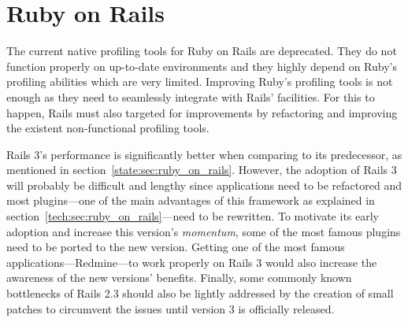 \section{Ruby on Rails}
The current native profiling tools for Ruby on Rails are deprecated. They do not function properly on up-to-date environments and they highly depend on Ruby's profiling abilities which are very limited. Improving Ruby's profiling tools is not enough as they need to seamlessly integrate with Rails' facilities. For this to happen, Rails must also targeted for improvements by refactoring and improving the existent non-functional profiling tools.

Rails 3's performance is significantly better when comparing to its predecessor, as mentioned in section~\ref{state:sec:ruby_on_rails}. However, the adoption of Rails 3 will probably be difficult and lengthy since applications need to be refactored and most plugins---one of the main advantages of this framework as explained in section~\ref{tech:sec:ruby_on_rails}---need to be rewritten. To motivate its early adoption and increase this version's \textit{momentum}, some of the most famous plugins need to be ported to the new version. Getting one of the most famous applications---Redmine---to work properly on Rails 3 would also increase the awareness of the new versions' benefits. Finally, some commonly known bottlenecks of Rails 2.3 should also be lightly addressed by the creation of small patches to circumvent the issues until version 3 is officially released.


\begin{comment}
Rails scalability should be easily accessible to everyone

Improve existing tools, create/improve measurement tools

Missing performance-oriented guidelines and conventions

Missing and out-dated tools to profile Rails applications

Optimal configurations and setups
\end{comment}
